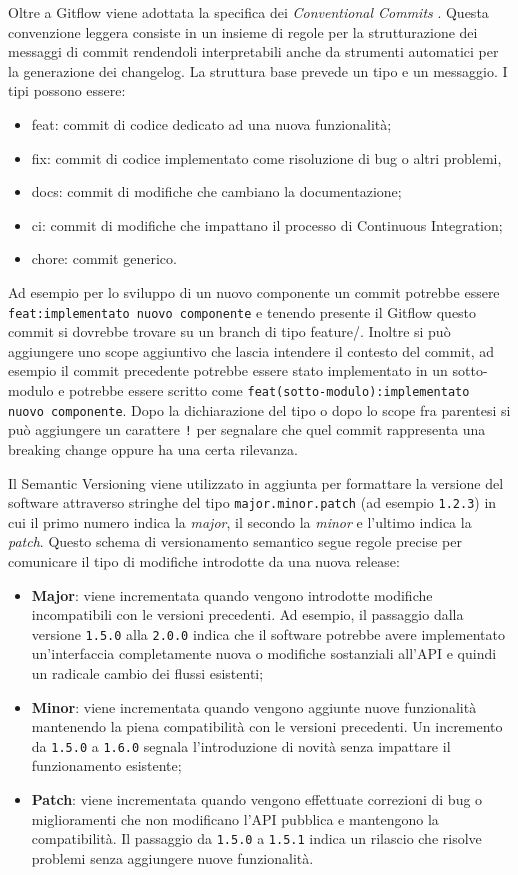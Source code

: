 \documentclass[target=bach,aauheader=,style=]{thud}
\begin{document}
Oltre a Gitflow viene adottata la specifica dei \textit{Conventional Commits} \cite{conventionalcommits_spec}. Questa convenzione leggera consiste in un insieme di regole per la strutturazione dei
messaggi di commit rendendoli interpretabili anche da strumenti automatici per la generazione dei changelog. La struttura base prevede un tipo e un messaggio. I tipi possono essere:
\begin{itemize}
\item feat: commit di codice dedicato ad una nuova funzionalità;
\item fix: commit di codice implementato come risoluzione di bug o altri problemi,
\item docs: commit di modifiche che cambiano la documentazione;
\item ci: commit di modifiche che impattano il processo di Continuous Integration;
\item chore: commit generico.
\end{itemize}
Ad esempio per lo sviluppo di un nuovo componente un commit potrebbe essere \texttt{feat:implementato nuovo componente} e tenendo presente il Gitflow questo commit si dovrebbe trovare su un branch di
tipo feature/. Inoltre si può aggiungere uno scope aggiuntivo che lascia intendere il contesto del commit, ad esempio il commit precedente potrebbe essere stato implementato in un sotto-modulo e
potrebbe essere scritto come \texttt{feat(sotto-modulo):implementato nuovo componente}. Dopo la dichiarazione del tipo o dopo lo scope fra parentesi si può aggiungere un carattere \texttt{!} per
segnalare che quel commit rappresenta una breaking change oppure ha una certa rilevanza.

Il Semantic Versioning \cite{semver_spec} viene utilizzato in aggiunta per formattare la versione del software attraverso stringhe del tipo \texttt{major.minor.patch} (ad esempio \texttt{1.2.3}) in
cui il primo numero indica la \textit{major}, il secondo la \textit{minor} e l'ultimo indica la \textit{patch}. Questo schema di versionamento semantico segue regole precise per comunicare il tipo di
modifiche introdotte da una nuova release:
\begin{itemize}
    \item \textbf{Major}: viene incrementata quando vengono introdotte modifiche incompatibili con le versioni precedenti. Ad esempio, il passaggio dalla versione \texttt{1.5.0} alla
    \texttt{2.0.0} indica che il software potrebbe avere implementato un'interfaccia completamente nuova o modifiche sostanziali all'API e quindi un radicale cambio dei flussi esistenti;
    \item \textbf{Minor}: viene incrementata quando vengono aggiunte nuove funzionalità mantenendo la piena compatibilità con le versioni precedenti. Un incremento da \texttt{1.5.0} a \texttt{1.6.0}
    segnala l'introduzione di novità senza impattare il funzionamento esistente;
    \item \textbf{Patch}: viene incrementata quando vengono effettuate correzioni di bug o miglioramenti che non modificano l'API pubblica e mantengono la compatibilità. Il passaggio da \texttt{1.5.0}
    a \texttt{1.5.1} indica un rilascio che risolve problemi senza aggiungere nuove funzionalità.
\end{itemize}
\end{document}
